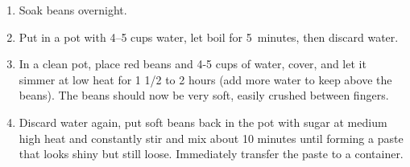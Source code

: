 \label{あんこ}

\begin{ingredients}
\end{ingredients}


\begin{recipe}
  \begin{enumerate}

  \item Soak beans overnight.
    
  \item Put in a pot with 4--5 cups water, let boil for 5~minutes, then discard water.
    
  \item In a clean pot, place red beans and 4-5 cups of water, cover,
    and let it simmer at low heat for 1 1/2 to 2 hours (add more water
    to keep above the beans). The beans should now be very soft,
    easily crushed between fingers.
    
  \item Discard water again, put soft beans back in the pot with sugar
    at medium high heat and constantly stir and mix about 10 minutes
    until forming a paste that looks shiny but still
    loose. Immediately transfer the paste to a container.

  \end{enumerate}
\end{recipe}

